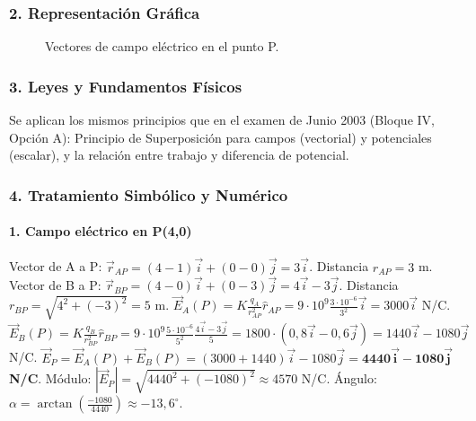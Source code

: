 \subsubsection*{2. Representación Gráfica}
\begin{figure}[H]
    \centering
    \caption{Vectores de campo eléctrico en el punto P.}
\end{figure}

\subsubsection*{3. Leyes y Fundamentos Físicos}
Se aplican los mismos principios que en el examen de Junio 2003 (Bloque IV, Opción A): Principio de Superposición para campos (vectorial) y potenciales (escalar), y la relación entre trabajo y diferencia de potencial.

\subsubsection*{4. Tratamiento Simbólico y Numérico}
\paragraph*{1. Campo eléctrico en P(4,0)}
Vector de A a P: $\vec{r}_{AP} = (4-1)\vec{i} + (0-0)\vec{j} = 3\vec{i}$. Distancia $r_{AP}=3$ m.
Vector de B a P: $\vec{r}_{BP} = (4-0)\vec{i} + (0-3)\vec{j} = 4\vec{i} - 3\vec{j}$. Distancia $r_{BP}=\sqrt{4^2+(-3)^2}=5$ m.
$\vec{E}_A(P) = K\frac{q_A}{r_{AP}^2}\hat{r}_{AP} = 9\cdot10^9 \frac{3\cdot10^{-6}}{3^2} \vec{i} = 3000 \vec{i}$ N/C.
$\vec{E}_B(P) = K\frac{q_B}{r_{BP}^2}\hat{r}_{BP} = 9\cdot10^9 \frac{5\cdot10^{-6}}{5^2} \frac{4\vec{i}-3\vec{j}}{5} = 1800 \cdot (0,8\vec{i}-0,6\vec{j}) = 1440\vec{i} - 1080\vec{j}$ N/C.
$\vec{E}_P = \vec{E}_A(P) + \vec{E}_B(P) = (3000+1440)\vec{i} - 1080\vec{j} = \boldsymbol{4440\vec{i} - 1080\vec{j}}$ \textbf{N/C}.
Módulo: $|\vec{E}_P| = \sqrt{4440^2 + (-1080)^2} \approx 4570$ N/C.
Ángulo: $\alpha = \arctan(\frac{-1080}{4440}) \approx -13,6^\circ$.

